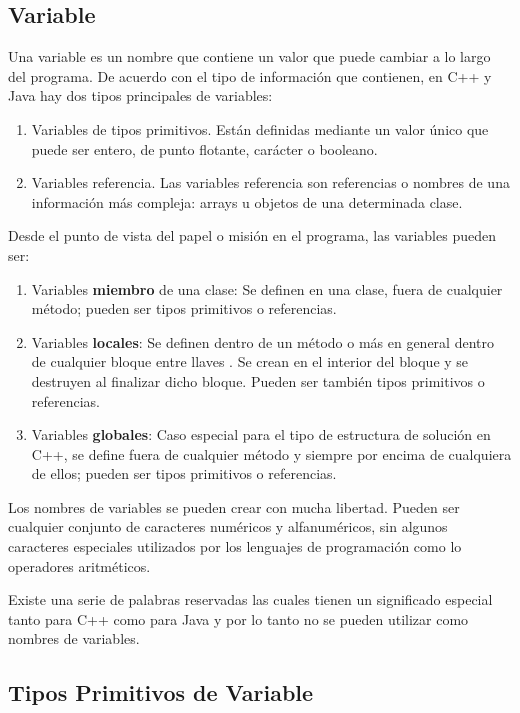 \subsection{Variable}

Una variable es un nombre que contiene un valor que puede cambiar a lo largo del programa. De
 acuerdo con el tipo de información que contienen, en C++ y Java hay dos tipos principales de variables:

\begin{enumerate}
	\item Variables de tipos primitivos. Están definidas mediante un valor único que puede ser
entero, de punto flotante, carácter o booleano.
	\item Variables referencia. Las variables referencia son referencias o nombres de una
información más compleja: arrays u objetos de una determinada clase.
\end{enumerate}

Desde el punto de vista del papel o misión en el programa, las variables pueden ser:

\begin{enumerate}
	\item Variables \textbf{miembro} de una clase: Se definen en una clase, fuera de cualquier método;
pueden ser tipos primitivos o referencias.
	\item Variables \textbf{locales}: Se definen dentro de un método o más en general dentro de cualquier
bloque entre llaves {}. Se crean en el interior del bloque y se destruyen al finalizar dicho
bloque. Pueden ser también tipos primitivos o referencias.
	
	\item Variables \textbf{globales}: Caso especial para el tipo de estructura de solución en C++, se define  fuera de cualquier método y siempre por encima de cualquiera de ellos; pueden ser tipos primitivos o referencias.
\end{enumerate}

Los nombres de variables se pueden crear con mucha libertad. Pueden ser cualquier
conjunto de caracteres numéricos y alfanuméricos, sin algunos caracteres especiales utilizados por los lenguajes de programación como lo operadores aritméticos. 

Existe una serie de palabras reservadas las cuales tienen un significado especial tanto para C++ como para Java y
por lo tanto no se pueden utilizar como nombres de variables.

\subsection{Tipos Primitivos de Variable}

